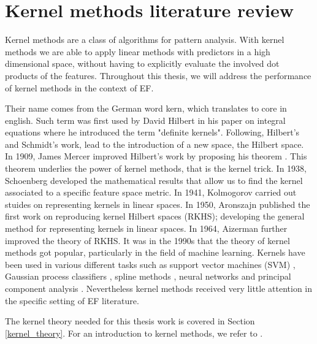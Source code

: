 \section{Kernel methods literature review}
Kernel methods are a class of algorithms for pattern analysis.
With kernel methods we are able to apply linear methods with predictors in a high dimensional space, without having to explicitly evaluate the involved dot products of the features.
Throughout this thesis, we will address the performance of kernel methods in the context of EF.

Their name comes from the German word kern, which translates to core in english. Such term was first used by David Hilbert in his paper on integral equations \cite{hilbert} where he introduced the term "definite kernels". Following, Hilbert's and Schmidt's work, \cite{schmidt} lead to the introduction of a new space, the Hilbert space.
In 1909, James Mercer improved Hilbert's work by proposing his theorem \cite{mercer}. This theorem underlies the power of kernel methods, that is the kernel trick.
In 1938, Schoenberg \cite{schoenberg} developed the mathematical results that allow us to find the kernel associated to a specific feature space metric.
In 1941, Kolmogorov \cite{kolmogorov} carried out stuides on representing kernels in linear spaces.
In 1950, Aronszajn \cite{aronszajn} published the first work on reproducing kernel Hilbert spaces (RKHS); developing the general method for representing kernels in linear spaces.
In 1964, Aizerman \cite{aizerman} further improved the theory of RKHS.
It was in the 1990s that the theory of kernel methods got popular, particularly in the field of machine learning. Kernels have been used in various different tasks such as support vector machines (SVM) \cite{vapnik1} \cite{vapnik2}, Gaussian process classifiers \cite{williams}, spline methods \cite{wahba}, neural networks \cite{poggio} and principal component analysis \cite{pca_scholkopf}.
Nevertheless kernel methods received very little attention in the specific setting of EF literature.

The kernel theory needed for this thesis work is covered in Section \ref{kernel_theory}. 
For an introduction to kernel methods, we refer to \cite{learning_with_kernels, hofmann2006review, shawe2004kernel}.

